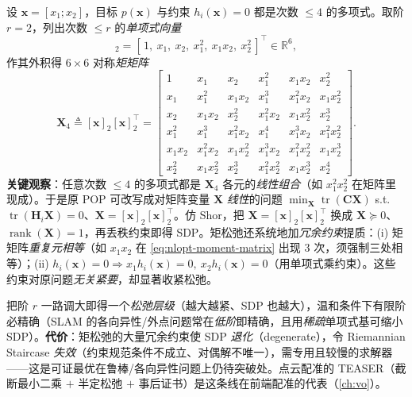 \begin{derivation}
\label{der:nlopt-moment}
设 $\mathbf{x}=[x_1;x_2]$，目标 $p(\mathbf{x})$ 与约束 $h_i(\mathbf{x})=0$ 都是次数 $\le4$ 的多项式。取阶 $r{=}2$，列出次数 $\le r$ 的\emph{单项式向量}
\begin{equation}
  [\mathbf{x}]_2=[\,1,\ x_1,\ x_2,\ x_1^2,\ x_1x_2,\ x_2^2\,]^\top\in\mathbb{R}^6,
  \label{eq:nlopt-moment-vec}
\end{equation}
作其外积得 $6\times6$ 对称\emph{矩矩阵}
\begin{equation}
  \mathbf{X}_4\triangleq[\mathbf{x}]_2[\mathbf{x}]_2^\top=
  \begin{bmatrix}
  1 & x_1 & x_2 & x_1^2 & x_1x_2 & x_2^2\\
  x_1 & x_1^2 & x_1x_2 & x_1^3 & x_1^2x_2 & x_1x_2^2\\
  x_2 & x_1x_2 & x_2^2 & x_1^2x_2 & x_1x_2^2 & x_2^3\\
  x_1^2 & x_1^3 & x_1^2x_2 & x_1^4 & x_1^3x_2 & x_1^2x_2^2\\
  x_1x_2 & x_1^2x_2 & x_1x_2^2 & x_1^3x_2 & x_1^2x_2^2 & x_1x_2^3\\
  x_2^2 & x_1x_2^2 & x_2^3 & x_1^2x_2^2 & x_1x_2^3 & x_2^4
  \end{bmatrix}.
  \label{eq:nlopt-moment-matrix}
\end{equation}
\textbf{关键观察}：任意次数 $\le4$ 的多项式都是 $\mathbf{X}_4$ 各元的\emph{线性组合}（如 $x_1^2x_2^2$ 在矩阵里现成）。于是原 POP 可改写成对矩阵变量 $\mathbf{X}$ \emph{线性}的问题 $\min_{\mathbf{X}}\operatorname{tr}(\mathbf{C}\mathbf{X})$ s.t. $\operatorname{tr}(\mathbf{H}_i\mathbf{X})=0$、$\mathbf{X}=[\mathbf{x}]_2[\mathbf{x}]_2^\top$。仿 Shor，把 $\mathbf{X}=[\mathbf{x}]_2[\mathbf{x}]_2^\top$ 换成 $\mathbf{X}\succeq0$、$\operatorname{rank}(\mathbf{X})=1$，再丢秩约束即得 SDP。矩松弛还系统地加\emph{冗余约束}提质：(i) 矩矩阵\emph{重复元相等}（如 $x_1x_2$ 在 \cref{eq:nlopt-moment-matrix} 出现 $3$ 次，须强制三处相等）；(ii) $h_i(\mathbf{x})=0\Rightarrow x_1h_i(\mathbf{x})=0,\ x_2h_i(\mathbf{x})=0$（用单项式乘约束）。这些约束对原问题\emph{无关紧要}，却显著收紧松弛。
\end{derivation}

\noindent 把阶 $r$ 一路调大即得一个\emph{松弛层级}（越大越紧、SDP 也越大），温和条件下有限阶必精确（SLAM 的各向异性/外点问题常在\emph{低阶}即精确，且用\emph{稀疏}单项式基可缩小 SDP）。\textbf{代价}：矩松弛的大量冗余约束使 SDP \emph{退化}（degenerate），令 Riemannian Staircase \emph{失效}（约束规范条件不成立、对偶解不唯一），需专用且较慢的求解器——这是可证最优在鲁棒/各向异性问题上仍待突破处。点云配准的 TEASER\cite{yang2021teaser}（截断最小二乘 $+$ 半定松弛 $+$ 事后证书）是这条线在前端配准的代表（\cref{ch:vo}）。

